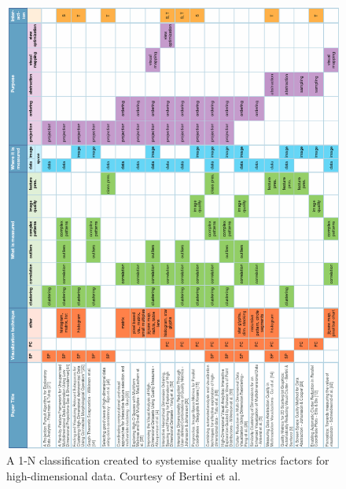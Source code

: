 \begin{figure}[p]
\begin{center}
\includegraphics[width=1\textwidth]{images/bertini2011quality}
\caption{A 1-N classification created to systemise quality metrics factors for high-dimensional data. Courtesy of Bertini et al.\ \cite{bertini2011quality}} \label{fig: bertini2011quality}
\end{center}
\end{figure}

%
%

